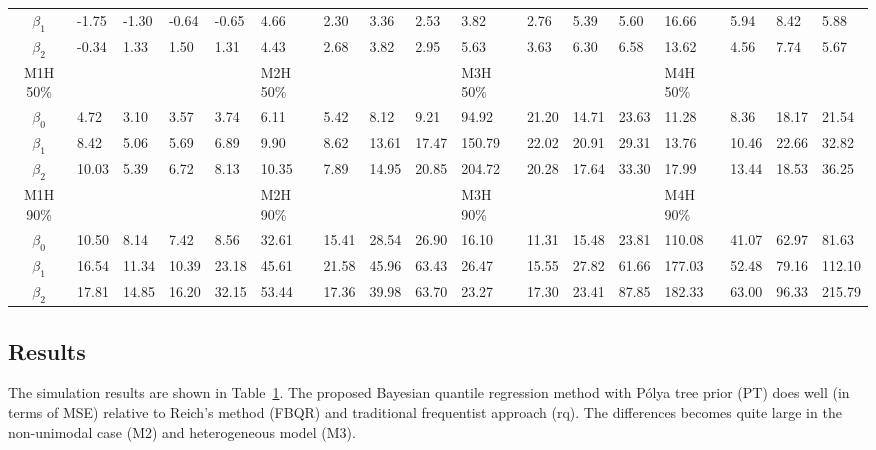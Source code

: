 \documentclass[12pt]{article}
\newcommand{\polya}{P\'{o}lya}
\begin{document}
\begin{landscape}
\begin{center}
\begin{table}[h]
\begin{tabular}[tb]{cllllllllllllllll}
  $\beta_1$ & -1.75 & -1.30 & -0.64 & -0.65 & 4.66     & 2.30  & 3.36  & 2.53  & 3.82     & 2.76  & 5.39  & 5.60    & 16.66    & 5.94  & 8.42  & 5.88   \\
  $\beta_2$ & -0.34 & 1.33  & 1.50  & 1.31  & 4.43     & 2.68  & 3.82  & 2.95  & 5.63     & 3.63  & 6.30  & 6.58    & 13.62    & 4.56  & 7.74  & 5.67   \\
\hline
M1H 50\%    &       &       &       &       & M2H 50\% &       &       &       & M3H 50\% &       &       &         & M4H 50\% &       &       &        \\
$\beta_0$   & 4.72  & 3.10  & 3.57  & 3.74  & 6.11     & 5.42  & 8.12  & 9.21  & 94.92    & 21.20 & 14.71 & 23.63   & 11.28    & 8.36  & 18.17 & 21.54  \\
  $\beta_1$ & 8.42  & 5.06  & 5.69  & 6.89  & 9.90     & 8.62  & 13.61 & 17.47 & 150.79   & 22.02 & 20.91 & 29.31   & 13.76    & 10.46 & 22.66 & 32.82  \\
  $\beta_2$ & 10.03 & 5.39  & 6.72  & 8.13  & 10.35    & 7.89  & 14.95 & 20.85 & 204.72   & 20.28 & 17.64 & 33.30   & 17.99    & 13.44 & 18.53 & 36.25  \\
M1H 90\%    &       &       &       &       & M2H 90\% &       &       &       & M3H 90\% &       &       &         & M4H 90\% &       &       &        \\
 $\beta_0$  & 10.50 & 8.14  & 7.42  & 8.56  & 32.61    & 15.41 & 28.54 & 26.90 & 16.10    & 11.31 & 15.48 & 23.81   & 110.08   & 41.07 & 62.97 & 81.63  \\
  $\beta_1$ & 16.54 & 11.34 & 10.39 & 23.18 & 45.61    & 21.58 & 45.96 & 63.43 & 26.47    & 15.55 & 27.82 & 61.66   & 177.03   & 52.48 & 79.16 & 112.10 \\
  $\beta_2$ & 17.81 & 14.85 & 16.20 & 32.15 & 53.44    & 17.36 & 39.98 & 63.70 & 23.27    & 17.30 & 23.41 & 87.85   & 182.33   & 63.00 & 96.33 & 215.79 \\
      \bottomrule
    \end{tabular}
    \label{tab:m1}
  \end{table}
\end{center}
\end{landscape}

\subsection{Results}
The simulation results are shown in Table~\ref{tab:m1}. The proposed
Bayesian quantile regression method with \polya{} tree prior (PT) does
well (in terms of MSE) relative to Reich's method (FBQR) and
traditional frequentist approach (rq).  The differences becomes quite
large in the non-unimodal case (M2) and heterogeneous model (M3).
\end{document}
